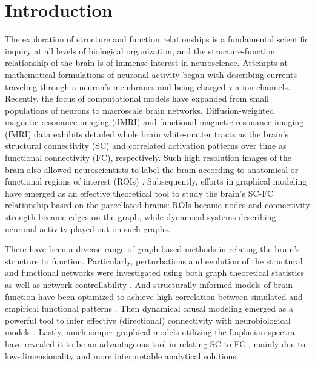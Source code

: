 \documentclass{article}
\begin{document}
\section{Introduction}
The exploration of structure and function relationships is a fundamental scientific inquiry at all levels of biological organization, and the structure-function relationship of the brain is of immense interest in neuroscience. Attempts at mathematical formulations of neuronal activity began with describing currents traveling through a neuron's membranes and being charged via ion channels\cite{hodgkin_quantitative_1952}. Recently, the focus of computational models have expanded from small populations of neurons to macroscale brain networks. Diffusion-weighted magnetic resonance imaging (dMRI) and functional magnetic resonance imaging (fMRI) data exhibits detailed whole brain white-matter tracts as the brain's structural connectivity (SC) and correlated activation patterns over time as functional connectivity (FC), respectively. Such high resolution images of the brain also allowed neuroscientists to label the brain according to anatomical or functional regions of interest (ROIs) \cite{Desikan2006, craddock_whole_2012}. Subsequently, efforts in graphical modeling have emerged as an effective theoretical tool to study the brain's SC-FC relationship based on the parcellated brains: ROIs became nodes and connectivity strength became edges on the graph, while dynamical systems describing neuronal activity played out on such graphs. 

There have been a diverse range of graph based methods in relating the brain's structure to function. Particularly, perturbations and evolution of the structural and functional networks were investigated using both graph theoretical statistics \cite{Kuceyeski2016} as well as network controllability \cite{gu_controllability_2015, Muldoon2016}. And structurally informed models of brain function have been optimized to achieve high correlation between simulated and empirical functional patterns \cite{Honey2009}. Then dynamical causal modeling emerged as a powerful tool to infer effective (directional) connectivity with neurobiological models \cite{frassle_generative_2018}. Lastly, much simper graphical models utilizing the Laplacian spectra have revealed it to be an advantageous tool in relating SC to FC \cite{Abdelnour2018}, mainly due to low-dimensionality and more interpretable analytical solutions.
\end{document}
